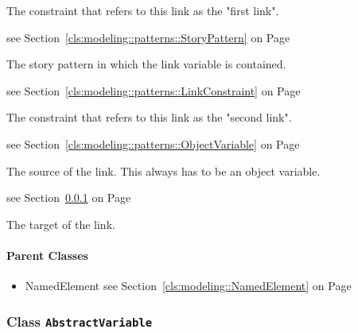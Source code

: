 \begin{description}
\begin{description}
	
			
The constraint that refers to this link as the "first link".	
		
	
\item[pattern : StoryPattern 	]
see Section~\ref{cls:modeling::patterns::StoryPattern} on Page~\pageref{cls:modeling::patterns::StoryPattern}
\hspace{\fill}
\nopagebreak


	
			
The story pattern in which the link variable is contained.	
		
	
\item[secondLinkConstraint : LinkConstraint 			\symbol{"5B}0..$*$\symbol{"5D}]
see Section~\ref{cls:modeling::patterns::LinkConstraint} on Page~\pageref{cls:modeling::patterns::LinkConstraint}
\hspace{\fill}
\nopagebreak


	
			
The constraint that refers to this link as the "second link".	
		
	
\item[source : ObjectVariable 	]
see Section~\ref{cls:modeling::patterns::ObjectVariable} on Page~\pageref{cls:modeling::patterns::ObjectVariable}
\hspace{\fill}
\nopagebreak


	
			
The source of the link. This always has to be an object variable.	
		
	
\item[target : AbstractVariable 	]
see Section~\ref{cls:modeling::patterns::AbstractVariable} on Page~\pageref{cls:modeling::patterns::AbstractVariable}
\hspace{\fill}
\nopagebreak


	
			
The target of the link.	
		
	
	\end{description}
	

\end{description}

\paragraph{Parent Classes}
\begin{itemize}
\item NamedElement see Section~\ref{cls:modeling::NamedElement} on Page~\pageref{cls:modeling::NamedElement}\end{itemize}
\subsubsection{\Large{Class \bfseries \texttt{AbstractVariable}\normalfont}}
\label{cls:modeling::patterns::AbstractVariable} 
